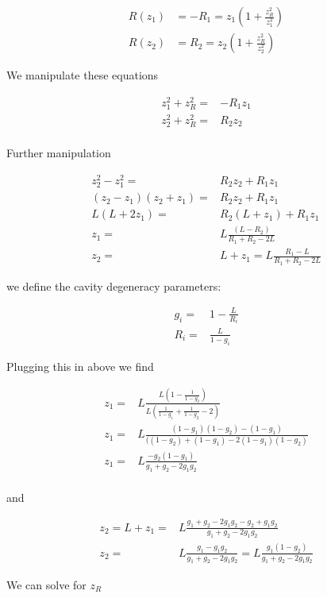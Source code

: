 \documentclass[12pt]{article}
\begin{document}
\begin{align}
R(z_1) &=  -R_1 = z_1\left(1+\frac{z_R^2}{z_1^2}\right)\\
R(z_2) &= R_2 = z_2\left(1+\frac{z_R^2}{z_2^2}\right)
\end{align}

We manipulate these equations

\begin{align}
z_1^2 + z_R^2 =& -R_1z_1\\
z_2^2 + z_R^2 =& R_2 z_2\\
\end{align}

Further manipulation

\begin{align}
z_2^2 - z_1^2 =& R_2z_2 + R_1 z_1\\
(z_2 - z_1)(z_2 + z_1) =& R_2 z_2 + R_1 z_1\\
L(L+2z_1) =& R_2(L+z_1) + R_1 z_1\\
z_1 =& L\frac{(L-R_2)}{R_1+R_2 - 2L}\\
z_2 =& L+z_1 = L \frac{R_1 - L}{R_1 + R_2 - 2L}
\end{align}

we define the cavity degeneracy parameters:

\begin{align}
g_i =& 1-\frac{L}{R_i}\\
R_i =& \frac{L}{1-g_i}
\end{align}

Plugging this in above we find

\begin{align}
z_1 =& L \frac{L\left(1-\frac{1}{1-g_2}\right)}{L\left(\frac{1}{1-g_1} + \frac{1}{1-g_2} - 2\right)}\\
z_1 =& L \frac{(1-g_1)(1-g_2) - (1-g_1)}{((1-g_2) + (1-g_1) - 2(1-g_1)(1-g_2)}\\
z_1 =& L \frac{-g_2(1-g_1)}{g_1 + g_2 - 2g_1g_2}\\
\end{align}

and

\begin{align}
z_2 = L+z_1 =& L\frac{g_1 + g_2 - 2g_1g_2 - g_2 + g_1 g_2}{g_1+g_2 - 2g_1 g_2}\\
z_2 =& L\frac{g_1 - g_1g_2}{g_1+g_2 - 2g_1 g_2} = L\frac{g_1(1-g_2)}{g_1+g_2-2g_1g_2}
\end{align}

We can solve for $z_R$
\end{document}
